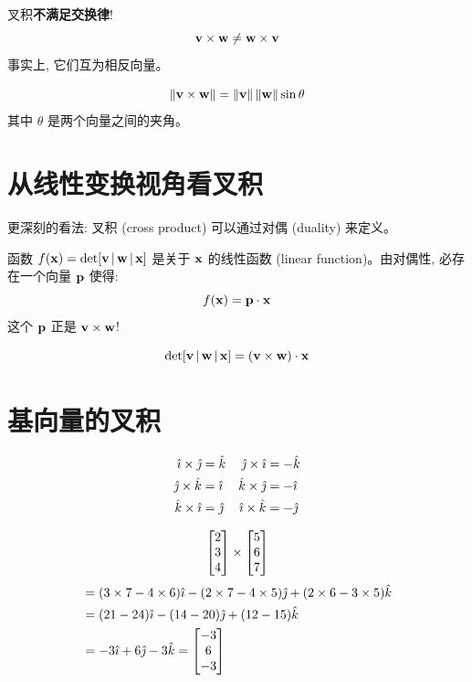 \begin{warning}
叉积\textbf{不满足交换律}!
\[
\mathbf{v} \times \mathbf{w} \neq \mathbf{w} \times \mathbf{v}
\]
事实上, 它们互为相反向量。
\end{warning}

\begin{theorem}[模长公式]
\[
\left\| \mathbf{v} \times \mathbf{w} \right\| = \left\| \mathbf{v} \right\| \left\| \mathbf{w} \right\| \sin\theta
\]
其中 $\theta$ 是两个向量之间的夹角。
\end{theorem}

\section{从线性变换视角看叉积}

\begin{intuition}
更深刻的看法: 叉积 (cross product) 可以通过对偶 (duality) 来定义。

函数 $f(\mathbf{x}) = \det[\mathbf{v} \,|\, \mathbf{w} \,|\, \mathbf{x}]$ 是关于 $\mathbf{x}$ 的线性函数 (linear function)。由对偶性, 必存在一个向量 $\mathbf{p}$ 使得:
\[
f(\mathbf{x}) = \mathbf{p} \cdot \mathbf{x}
\]
这个 $\mathbf{p}$ 正是 $\mathbf{v} \times \mathbf{w}$!
\end{intuition}

\begin{theorem}
\[
\det[\mathbf{v} \,|\, \mathbf{w} \,|\, \mathbf{x}] = (\mathbf{v} \times \mathbf{w}) \cdot \mathbf{x}
\]
\end{theorem}

\section{基向量的叉积}

\begin{theorem}[基向量的叉积]
\begin{align*}
\hat{\imath} \times \hat{\jmath} &= \hat{k} & \hat{\jmath} \times \hat{\imath} &= -\hat{k} \\
\hat{\jmath} \times \hat{k} &= \hat{\imath} & \hat{k} \times \hat{\jmath} &= -\hat{\imath} \\
\hat{k} \times \hat{\imath} &= \hat{\jmath} & \hat{\imath} \times \hat{k} &= -\hat{\jmath}
\end{align*}
\end{theorem}

\begin{example}
\[
\begin{bmatrix} 2 \\ 3 \\ 4 \end{bmatrix} \times \begin{bmatrix} 5 \\ 6 \\ 7 \end{bmatrix}
\]
\begin{align*}
&= (3 \times 7 - 4 \times 6)\hat{\imath} - (2 \times 7 - 4 \times 5)\hat{\jmath} + (2 \times 6 - 3 \times 5)\hat{k} \\
&= (21-24)\hat{\imath} - (14-20)\hat{\jmath} + (12-15)\hat{k} \\
&= -3\hat{\imath} + 6\hat{\jmath} - 3\hat{k} = \begin{bmatrix} -3 \\ 6 \\ -3 \end{bmatrix}
\end{align*}
\end{example}

